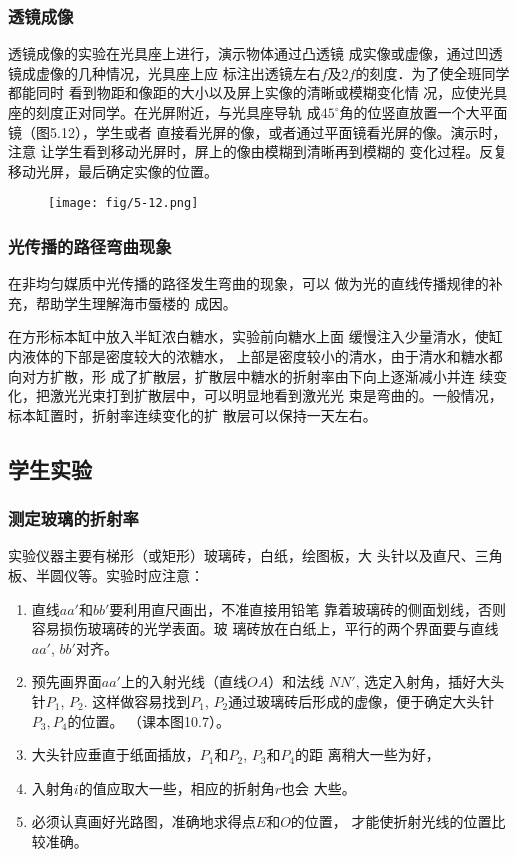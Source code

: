 \subsubsection{透镜成像}
透镜成像的实验在光具座上进行，演示物体通过凸透镜
成实像或虚像，通过凹透镜成虚像的几种情况，光具座上应
标注出透镜左右$f$及$2f$的刻度．为了使全班同学都能同时
看到物距和像距的大小以及屏上实像的清晰或模糊变化情
况，应使光具座的刻度正对同学。在光屏附近，与光具座导轨
成$45^{\circ}$角的位竖直放置一个大平面镜（图5.12），学生或者
直接看光屏的像，或者通过平面镜看光屏的像。演示时，注意
让学生看到移动光屏时，屏上的像由模糊到清晰再到模糊的
变化过程。反复移动光屏，最后确定实像的位置。
\begin{figure}[htp]
    \centering
    \texttt{[image: fig/5-12.png]}
    \caption{}
\end{figure}

\subsubsection{光传播的路径弯曲现象}

在非均匀媒质中光传播的路径发生弯曲的现象，可以
做为光的直线传播规律的补充，帮助学生理解海市蜃楼的
成因。

在方形标本缸中放入半缸浓白糖水，实验前向糖水上面
缓慢注入少量清水，使缸内液体的下部是密度较大的浓糖水，
上部是密度较小的清水，由于清水和糖水都向对方扩散，形
成了扩散层，扩散层中糖水的折射率由下向上逐渐减小并连
续变化，把激光光束打到扩散层中，可以明显地看到激光光
束是弯曲的。一般情况，标本缸置时，折射率连续变化的扩
散层可以保持一天左右。

\subsection{学生实验}
\subsubsection{测定玻璃的折射率}
实验仪器主要有梯形（或矩形）玻璃砖，白纸，绘图板，大
头针以及直尺、三角板、半圆仪等。实验时应注意：
\begin{enumerate}
\item 直线$aa'$和$bb'$要利用直尺画出，不准直接用铅笔
靠着玻璃砖的侧面划线，否则容易损伤玻璃砖的光学表面。玻
璃砖放在白纸上，平行的两个界面要与直线$aa'$, $bb'$对齐。
\item 预先画界面$aa'$上的入射光线（直线$OA$）和法线
$NN'$, 选定入射角，插好大头针$P_1$, $P_2$. 这样做容易找到$P_1$,
$P_2$通过玻璃砖后形成的虚像，便于确定大头针$P_3,P_4$的位置。
（课本图10.7）。
\item 大头针应垂直于纸面插放，$P_1$和$P_2$, $P_3$和$P_4$的距
离稍大一些为好，
\item 入射角$i$的值应取大一些，相应的折射角$r$也会
大些。
\item 必须认真画好光路图，准确地求得点$E$和$O$的位置，
才能使折射光线的位置比较准确。
\end{enumerate}

